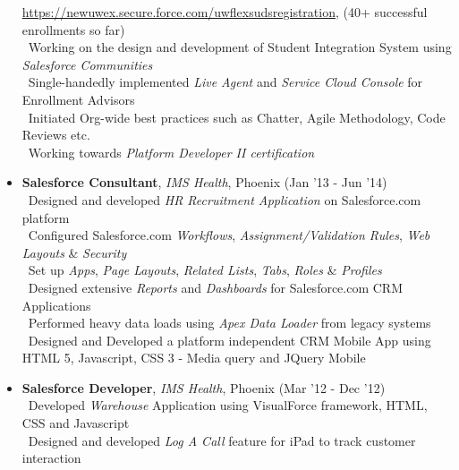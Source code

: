 \documentclass[11pt]{article}
\begin{document}
\begin{itemize}
		\url{https://newuwex.secure.force.com/uwflexsudsregistration}, (40+ successful enrollments so far)\\
		\noindent \textendash\ Working on the design and development of Student 
		Integration System using \textit{Salesforce Communities}\\
		\noindent \textendash\ Single-handedly implemented \textit{Live Agent} and 
		\textit{Service Cloud Console} for Enrollment Advisors\\
		\noindent \textendash\ Initiated Org-wide best practices such as Chatter, Agile 
		Methodology, Code Reviews etc.\\
		\noindent \textendash\ Working towards \textit{Platform Developer II certification} \\
	\item{\textbf{Salesforce Consultant}, \textit{IMS Health}, Phoenix \hfill (Jan '13 - 
	Jun '14)}\\
		\noindent \textendash\ Designed and developed \textit{HR Recruitment Application} on Salesforce.com platform\\
		\textendash\ Configured Salesforce.com \textit{Workflows}, \textit{Assignment/Validation Rules}, \textit{Web Layouts} \& \textit{Security}\\
		\textendash\ Set up \textit{Apps}, \textit{Page Layouts}, \textit{Related Lists}, \textit{Tabs}, \textit{Roles} \& \textit{Profiles}\\
		\textendash\ Designed extensive \textit{Reports} and \textit{Dashboards} for Salesforce.com CRM Applications\\
		\textendash\ Performed heavy data loads using \textit{Apex Data Loader} from legacy systems\\
\textendash\ Designed and Developed a platform independent CRM Mobile App using HTML 5, Javascript, CSS 3 - Media query and JQuery Mobile\\
	\item{\textbf{Salesforce Developer}, \textit{IMS Health}, Phoenix \hfill (Mar '12  - Dec '12)}\\
		\textendash\ Developed \textit{Warehouse} Application using VisualForce framework, HTML, CSS and Javascript\\
		\textendash\ Designed and developed \textit{Log A Call} feature for iPad to track customer interaction\\

\end{itemize}
\end{document}
